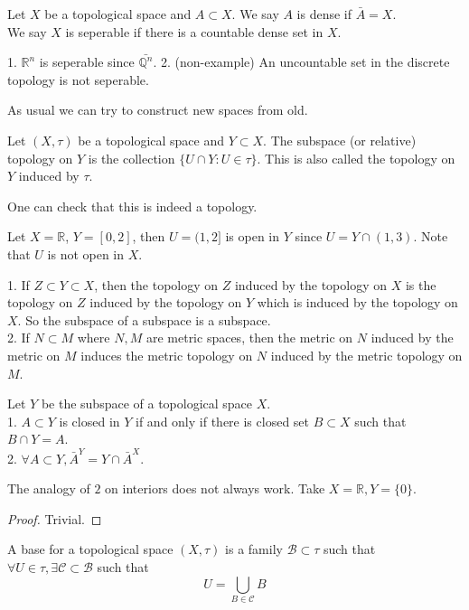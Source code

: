 \begin{definition}
    Let $X$ be a topological space and $A\subset X$.
    We say $A$ is dense if $\bar{A}=X$.\\
    We say $X$ is seperable if there is a countable dense set in $X$.
\end{definition}
\begin{definition}
    1. $\mathbb R^n$ is seperable since $\bar{\mathbb Q^n}$.
    2. (non-example) An uncountable set in the discrete topology is not seperable.
\end{definition}
As usual we can try to construct new spaces from old.
\begin{definition}
    Let $(X,\tau)$ be a topological space and $Y\subset X$.
    The subspace (or relative) topology on $Y$ is the collection $\{U\cap Y:U\in\tau\}$.
    This is also called the topology on $Y$ induced by $\tau$.
\end{definition}
One can check that this is indeed a topology.
\begin{example}
    Let $X=\mathbb R$, $Y=[0,2]$, then $U=(1,2]$ is open in $Y$ since $U=Y\cap (1,3)$.
    Note that $U$ is not open in $X$.
\end{example}
\begin{remark}
    1. If $Z\subset Y\subset X$, then the topology on $Z$ induced by the topology on $X$ is the topology on $Z$ induced by the topology on $Y$ which is induced by the topology on $X$.
    So the subspace of a subspace is a subspace.\\
    2. If $N\subset M$ where $N,M$ are metric spaces, then the metric on $N$ induced by the metric on $M$ induces the metric topology on $N$ induced by the metric topology on $M$.
\end{remark}
\begin{proposition}
    Let $Y$ be the subspace of a topological space $X$.\\
    1. $A\subset Y$ is closed in $Y$ if and only if there is closed set $B\subset X$ such that $B\cap Y=A$.\\
    2. $\forall A\subset Y, \bar{A}^Y=Y\cap\bar{A}^X$.
\end{proposition}
\begin{remark}
    The analogy of $2$ on interiors does not always work.
    Take $X=\mathbb R,Y=\{0\}$.
\end{remark}
\begin{proof}
    Trivial.
\end{proof}
\begin{definition}
    A base for a topological space $(X,\tau)$ is a family $\mathscr B\subset\tau$ such that $\forall U\in\tau,\exists \mathscr C\subset\mathscr B$ such that
    $$U=\bigcup_{B\in\mathscr C}B$$
\end{definition}

